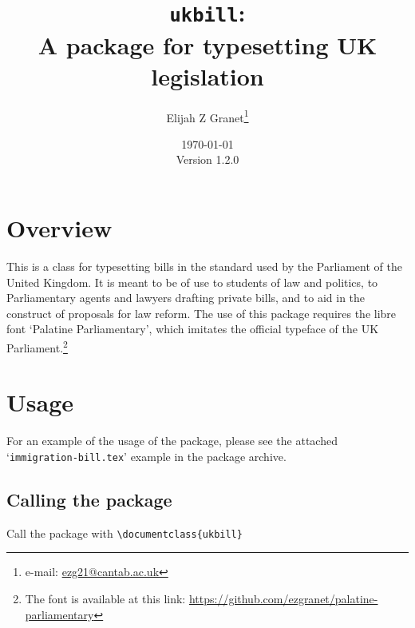\documentclass{article}
\date{\today\\\smallskip\ttfamily Version 1.2.0}
\author{Elijah Z Granet\thanks{e-mail: \href{mailto:ezg21@cantab.ac.uk}{\ttfamily ezg21@cantab.ac.uk}}}
\title{\texttt{ukbill}:\\A package for typesetting UK legislation}
\begin{document}
\maketitle
\tableofcontents
\clearpage
\section{Overview}
This is a class for typesetting bills in the standard used by the Parliament of the United Kingdom. It is meant to be of use to students of law and politics, to Parliamentary agents and lawyers drafting private bills, and to aid in the construct of proposals for law reform. The use of this package requires the libre font `Palatine Parliamentary', which imitates the official typeface of the UK Parliament.\footnote{The font is available at this link: \url{https://github.com/ezgranet/palatine-parliamentary}}
\section{Usage}
For an example of the usage of the package, please see the attached `\texttt{immigration-bill.tex}' example in the package archive.

\subsection{Calling the package}
Call the package with {\color{darkspringgreen}\ttfamily \verb|\documentclass{ukbill}|}
\end{document}
